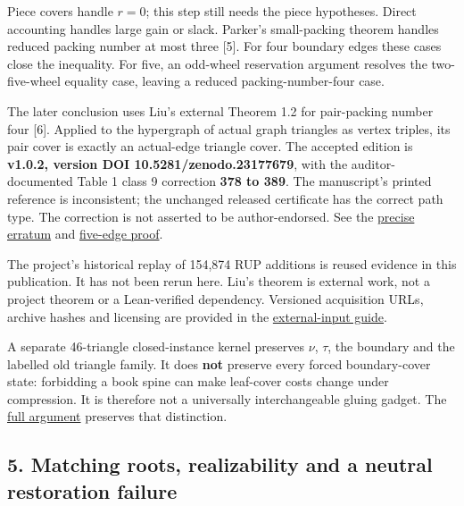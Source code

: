 \documentclass[11pt,a4paper]{article}
\begin{document}
Piece covers handle \(r=0\); this step still needs the piece hypotheses. Direct accounting handles large gain or slack. Parker's small-packing theorem handles reduced packing number at most three {[}5{]}. For four boundary edges these cases close the inequality. For five, an odd-wheel reservation argument resolves the two-five-wheel equality case, leaving a reduced packing-number-four case.

The later conclusion uses Liu's external Theorem 1.2 for pair-packing number four {[}6{]}. Applied to the hypergraph of actual graph triangles as vertex triples, its pair cover is exactly an actual-edge triangle cover. The accepted edition is \textbf{v1.0.2, version DOI 10.5281/zenodo.23177679}, with the auditor-documented Table 1 class 9 correction \textbf{378 to 389}. The manuscript's printed reference is inconsistent; the unchanged released certificate has the correct path type. The correction is not asserted to be author-endorsed. See the \href{https://github.com/pappa211/ai-math-experiments/blob/main/problems/TUZA-11/external/CLASS9_TABLE_ERRATUM.md}{precise erratum} and \href{https://github.com/pappa211/ai-math-experiments/blob/main/problems/TUZA-11/external/FIVE_EDGE_GLUING_COROLLARY.md}{five-edge proof}.

The project's historical replay of 154,874 RUP additions is reused evidence in this publication. It has not been rerun here. Liu's theorem is external work, not a project theorem or a Lean-verified dependency. Versioned acquisition URLs, archive hashes and licensing are provided in the \href{https://github.com/pappa211/ai-math-experiments/blob/main/problems/TUZA-11/external/README.md}{external-input guide}.

A separate 46-triangle closed-instance kernel preserves \(\nu\), \(\tau\), the boundary and the labelled old triangle family. It does \textbf{not} preserve every forced boundary-cover state: forbidding a book spine can make leaf-cover costs change under compression. It is therefore not a universally interchangeable gluing gadget. The \href{https://github.com/pappa211/ai-math-experiments/blob/main/problems/TUZA-11/arguments/FLAT_GLUING_AND_KERNEL.md}{full argument} preserves that distinction.

\subsection{5. Matching roots, realizability and a neutral restoration failure}\label{matching-roots-realizability-and-a-neutral-restoration-failure}
\end{document}
